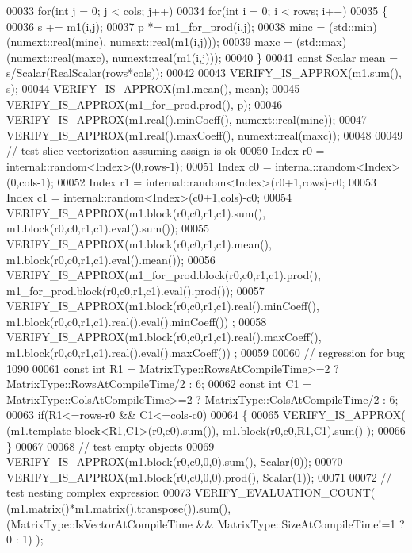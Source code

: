 \begin{DoxyCode}
00033   \textcolor{keywordflow}{for}(\textcolor{keywordtype}{int} j = 0; j < cols; j++)
00034   \textcolor{keywordflow}{for}(\textcolor{keywordtype}{int} i = 0; i < rows; i++)
00035   \{
00036     s += m1(i,j);
00037     p *= m1\_for\_prod(i,j);
00038     minc = (std::min)(numext::real(minc), numext::real(m1(i,j)));
00039     maxc = (std::max)(numext::real(maxc), numext::real(m1(i,j)));
00040   \}
00041   \textcolor{keyword}{const} Scalar mean = s/Scalar(RealScalar(rows*cols));
00042 
00043   VERIFY\_IS\_APPROX(m1.sum(), s);
00044   VERIFY\_IS\_APPROX(m1.mean(), mean);
00045   VERIFY\_IS\_APPROX(m1\_for\_prod.prod(), p);
00046   VERIFY\_IS\_APPROX(m1.real().minCoeff(), numext::real(minc));
00047   VERIFY\_IS\_APPROX(m1.real().maxCoeff(), numext::real(maxc));
00048 
00049   \textcolor{comment}{// test slice vectorization assuming assign is ok}
00050   Index r0 = internal::random<Index>(0,rows-1);
00051   Index c0 = internal::random<Index>(0,cols-1);
00052   Index r1 = internal::random<Index>(r0+1,rows)-r0;
00053   Index c1 = internal::random<Index>(c0+1,cols)-c0;
00054   VERIFY\_IS\_APPROX(m1.block(r0,c0,r1,c1).sum(), m1.block(r0,c0,r1,c1).eval().sum());
00055   VERIFY\_IS\_APPROX(m1.block(r0,c0,r1,c1).mean(), m1.block(r0,c0,r1,c1).eval().mean());
00056   VERIFY\_IS\_APPROX(m1\_for\_prod.block(r0,c0,r1,c1).prod(), m1\_for\_prod.block(r0,c0,r1,c1).eval().prod());
00057   VERIFY\_IS\_APPROX(m1.block(r0,c0,r1,c1).real().minCoeff(), m1.block(r0,c0,r1,c1).real().eval().minCoeff())
      ;
00058   VERIFY\_IS\_APPROX(m1.block(r0,c0,r1,c1).real().maxCoeff(), m1.block(r0,c0,r1,c1).real().eval().maxCoeff())
      ;
00059 
00060   \textcolor{comment}{// regression for bug 1090}
00061   \textcolor{keyword}{const} \textcolor{keywordtype}{int} R1 = MatrixType::RowsAtCompileTime>=2 ? MatrixType::RowsAtCompileTime/2 : 6;
00062   \textcolor{keyword}{const} \textcolor{keywordtype}{int} C1 = MatrixType::ColsAtCompileTime>=2 ? MatrixType::ColsAtCompileTime/2 : 6;
00063   \textcolor{keywordflow}{if}(R1<=rows-r0 && C1<=cols-c0)
00064   \{
00065     VERIFY\_IS\_APPROX( (m1.template block<R1,C1>(r0,c0).sum()), m1.block(r0,c0,R1,C1).sum() );
00066   \}
00067   
00068   \textcolor{comment}{// test empty objects}
00069   VERIFY\_IS\_APPROX(m1.block(r0,c0,0,0).sum(),   Scalar(0));
00070   VERIFY\_IS\_APPROX(m1.block(r0,c0,0,0).prod(),  Scalar(1));
00071 
00072   \textcolor{comment}{// test nesting complex expression}
00073   VERIFY\_EVALUATION\_COUNT( (m1.matrix()*m1.matrix().transpose()).sum(), (MatrixType::IsVectorAtCompileTime 
      && MatrixType::SizeAtCompileTime!=1 ? 0 : 1) );

\end{DoxyCode}
